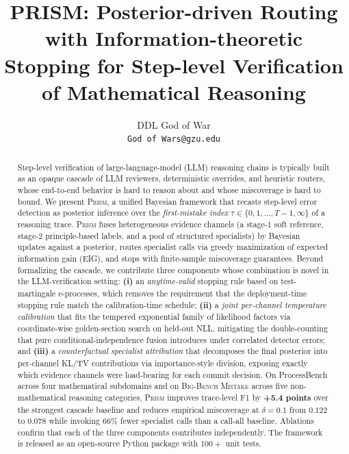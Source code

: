\documentclass[11pt,a4paper]{article}
\title{\textbf{PRISM: Posterior-driven Routing with Information-theoretic\\
Stopping for Step-level Verification of Mathematical Reasoning}}
\author{%
  DDL God of War\\
  \texttt{God of Wars@gzu.edu}
}
\date{}
\theoremstyle{plain}
\theoremstyle{definition}
\theoremstyle{remark}
\begin{document}
\maketitle

\begin{abstract}
Step-level verification of large-language-model (LLM) reasoning chains
is typically built as an opaque cascade of LLM reviewers, deterministic
overrides, and heuristic routers, whose end-to-end behavior is hard to
reason about and whose miscoverage is hard to bound.
We present \textsc{Prism}, a unified Bayesian framework that recasts
step-level error detection as posterior inference over the
\emph{first-mistake index} $\tau \in \{0,1,\dots,T{-}1,\infty\}$ of a
reasoning trace.
\textsc{Prism} fuses heterogeneous evidence channels (a stage-1 soft
reference, stage-2 principle-based labels, and a pool of structured
specialists) by Bayesian updates against a posterior, routes specialist
calls via greedy maximization of expected information gain (EIG), and
stops with finite-sample miscoverage guarantees. Beyond formalizing the
cascade, we contribute three components whose combination is novel in
the LLM-verification setting: \textbf{(i)} an \emph{anytime-valid}
stopping rule based on test-martingale e-processes, which removes the
requirement that the deployment-time stopping rule match the
calibration-time schedule; \textbf{(ii)} a \emph{joint per-channel
temperature calibration} that fits the tempered exponential family of
likelihood factors via coordinate-wise golden-section search on
held-out NLL, mitigating the double-counting that pure
conditional-independence fusion introduces under correlated detector
errors; and \textbf{(iii)} a \emph{counterfactual specialist
attribution} that decomposes the final posterior into per-channel
KL/TV contributions via importance-style division, exposing exactly
which evidence channels were load-bearing for each commit decision.
On ProcessBench across four mathematical subdomains and on
\textsc{Big-Bench Mistake} across five non-mathematical reasoning
categories, \textsc{Prism} improves trace-level F1 by
\textbf{+5.4 points} over the strongest cascade baseline and reduces
empirical miscoverage at $\delta{=}0.1$ from $0.122$ to $\mathbf{0.078}$
while invoking $66\%$ fewer specialist calls than a call-all baseline.
Ablations confirm that each of the three components contributes
independently. The framework is released as an open-source Python
package with $100\!+$ unit tests.
\end{abstract}
\end{document}
